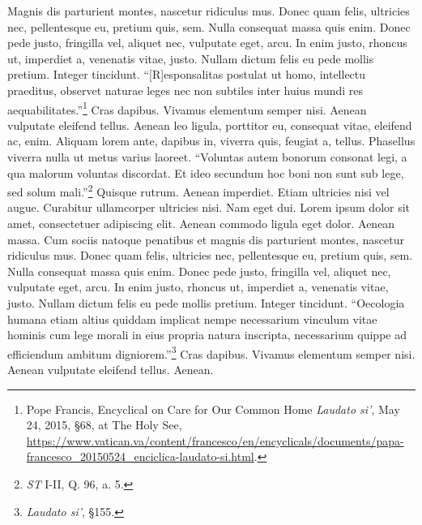 \documentclass[
    12pt,
    letterpaper,
    oneside,
    noraggedright
]{turabian-researchpaper}
\begin{document}
Magnis dis parturient montes, nascetur ridiculus mus. Donec quam felis,
ultricies nec, pellentesque eu, pretium quis, sem. Nulla consequat massa
quis enim. Donec pede justo, fringilla vel, aliquet nec, vulputate eget,
arcu. In enim justo, rhoncus ut, imperdiet a, venenatis vitae, justo.
Nullam dictum felis eu pede mollis pretium. Integer tincidunt.
``{[}R{]}esponsalitas postulat ut homo, intellectu praeditus, observet
naturae leges nec non subtiles inter huius mundi res
aequabilitates.''\footnote{Pope Francis, {Encyclical on Care for Our
  Common Home \emph{Laudato si'},} May 24, 2015, §68, at The Holy See,
  \url{https://www.vatican.va/content/francesco/en/encyclicals/documents/papa-francesco_20150524_enciclica-laudato-si.html}.}
Cras dapibus. Vivamus elementum semper nisi. Aenean vulputate eleifend
tellus. Aenean leo ligula, porttitor eu, consequat vitae, eleifend ac,
enim. Aliquam lorem ante, dapibus in, viverra quis, feugiat a, tellus.
Phasellus viverra nulla ut metus varius laoreet. ``Voluntas autem
bonorum consonat legi, a qua malorum voluntas discordat. Et ideo
secundum hoc boni non sunt sub lege, sed solum mali.''\footnote{\emph{ST}
  I-II, Q. 96, a. 5.} Quisque rutrum. Aenean imperdiet. Etiam ultricies
nisi vel augue. Curabitur ullamcorper ultricies nisi. Nam eget dui.
Lorem ipsum dolor sit amet, consectetuer adipiscing elit. Aenean commodo
ligula eget dolor. Aenean massa. Cum sociis natoque penatibus et magnis
dis parturient montes, nascetur ridiculus mus. Donec quam felis,
ultricies nec, pellentesque eu, pretium quis, sem. Nulla consequat massa
quis enim. Donec pede justo, fringilla vel, aliquet nec, vulputate eget,
arcu. In enim justo, rhoncus ut, imperdiet a, venenatis vitae, justo.
Nullam dictum felis eu pede mollis pretium. Integer tincidunt.
``Oecologia humana etiam altius quiddam implicat nempe necessarium
vinculum vitae hominis cum lege morali in eius propria natura inscripta,
necessarium quippe ad efficiendum ambitum digniorem.''\footnote{{\emph{Laudato
  si'},} §155.} Cras dapibus. Vivamus elementum semper nisi. Aenean
vulputate eleifend tellus. Aenean.
\end{document}
